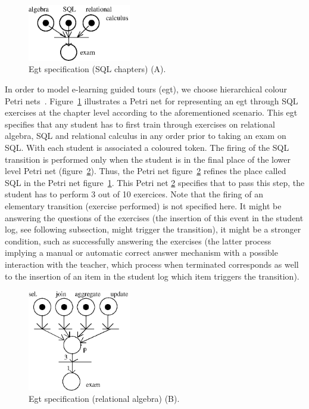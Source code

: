 \begin{figure}[htpb]
\begin{center}
\includegraphics[width=45mm]{petria.eps}
\caption{Egt specification (SQL chapters) (A).}
\label{petria}
\end{center}
\end{figure}


In order to model e-learning guided tours (egt), we choose
hierarchical colour Petri nets~\cite{Petri}. Figure~\ref{petria}
illustrates a Petri net for representing an egt through SQL exercises
at the chapter level according to the aforementioned scenario. This
egt specifies that any student has to first 
train through exercises on relational algebra, SQL and relational
calculus in any order prior to taking an exam on SQL. With each
student is associated a coloured token. The firing of the SQL
transition is performed only when the student is in the final place of
the lower level Petri net (figure~\ref{petrib}). Thus, the Petri net
figure~\ref{petrib} refines the place called SQL in the Petri net figure~\ref{petria}. This Petri net \ref{petrib} specifies
that to pass this step, the student has to perform 3 out of 10
exercices. Note that the firing of an elementary transition 
(exercise performed) is
not specified here. It might be answering the questions of the
exercises (the insertion of this event in the student log, see
following subsection, might trigger the transition), it might be a
stronger condition, such as successfully answering the exercises (the
latter process implying a manual or automatic correct answer mechanism
with a possible interaction with the teacher, which process when
terminated corresponds as well to the insertion of an item in the
student log which item triggers the transition).

\begin{figure}[htbp]
\begin{center}
\includegraphics[width=45mm]{petrib.eps}
\caption{Egt specification (relational algebra) (B).}
\end{center}
\label{petrib}
\end{figure}


